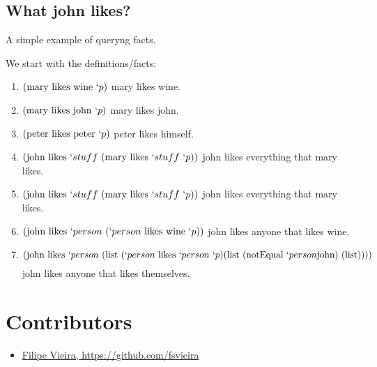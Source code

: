 \documentclass[11pt,a4paper]{report}
\newcommand{\var}[1]{`#1}
\begin{document}
\subsection{What john likes?}

A simple example of queryng facts.

We start with the definitions/facts:
\begin{enumerate}

\item $(\text{mary}\ \text{likes}\ \text{wine}\ \var{p})$
\subitem mary likes wine.

\item $(\text{mary}\ \text{likes}\ \text{john}\ \var{p})$
\subitem mary likes john.

\item $(\text{peter}\ \text{likes}\ \text{peter}\ \var{p})$
\subitem peter likes himself.

\item $(\text{john}\ \text{likes}\ \var{stuff}\ (\text{mary}\ \text{likes}\ \var{stuff}\ \var{p}))$
\subitem john likes everything that mary likes.

\item $(\text{john}\ \text{likes}\ \var{stuff}\ (\text{mary}\ \text{likes}\ \var{stuff}\ \var{p}))$
\subitem john likes everything that mary likes.

\item $(\text{john}\ \text{likes}\ \var{person}\ (\var{person}\ \text{likes}\ \text{wine}\ \var{p}))$
\subitem john likes anyone that likes wine.

\item \[
    (\text{john}\ \text{likes}\ \var{person}\ (\text{list}\ (\var{person}\ \text{likes}\ \var{person}\ \var{p}) (\text{list}\ (\text{notEqual}\ \var{person} \text{john})\ (\text{list}))))
\]
\subitem john likes anyone that likes themselves.

\end{enumerate}


\section{Contributors}
\label{sec:contributors}

\begin{itemize}
    \item \href{https://github.com/fsvieira}{Filipe Vieira, https://github.com/fsvieira}
\end{itemize}
\end{document}
